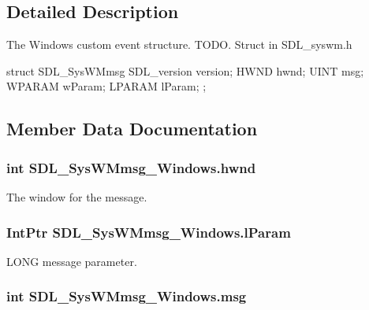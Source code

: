 \subsection{Detailed Description}
The Windows custom event structure. TODO. Struct in SDL\_\-syswm.h 
\begin{DoxyCode}
            struct SDL_SysWMmsg {
                SDL_version version;
                HWND hwnd;
                UINT msg;
                WPARAM wParam;
                LPARAM lParam;
            };          
\end{DoxyCode}
  

\subsection{Member Data Documentation}
\hypertarget{struct_s_d_l___sys_w_mmsg___windows_a197fcf1eff43c69746d9df7dfcc86acf}{
\subsubsection[{hwnd}]{\setlength{\rightskip}{0pt plus 5cm}int {\bf SDL\_\-SysWMmsg\_\-Windows.hwnd}}}
\label{struct_s_d_l___sys_w_mmsg___windows_a197fcf1eff43c69746d9df7dfcc86acf}


The window for the message. 

\hypertarget{struct_s_d_l___sys_w_mmsg___windows_a25b6bfe58d3358a1415854c4eea4c38f}{
\subsubsection[{lParam}]{\setlength{\rightskip}{0pt plus 5cm}IntPtr {\bf SDL\_\-SysWMmsg\_\-Windows.lParam}}}
\label{struct_s_d_l___sys_w_mmsg___windows_a25b6bfe58d3358a1415854c4eea4c38f}


LONG message parameter. 

\hypertarget{struct_s_d_l___sys_w_mmsg___windows_aa1f227c29c7df1e3d1585e79911c5c12}{
\subsubsection[{msg}]{\setlength{\rightskip}{0pt plus 5cm}int {\bf SDL\_\-SysWMmsg\_\-Windows.msg}}}
\label{struct_s_d_l___sys_w_mmsg___windows_aa1f227c29c7df1e3d1585e79911c5c12}



